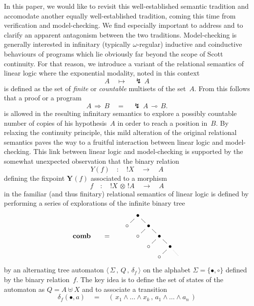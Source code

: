 \documentclass[runningheads,a4paper]{llncs}
\newcommand{\superbang}{\lightning} \newcommand{\modality}{\Box}
\newcommand{\tensor}{\otimes}
\newcommand{\morph}[1]{\stackrel{#1}{\longrightarrow}}
\newcommand{\fixpoint}[1]{\textbf{Y}_{#1}}
\begin{document}
In this paper, we would like to revisit this well-established semantic tradition and accomodate another equally well-established tradition,
coming this time from verification and model-checking.
We find especially important to address and to clarify an apparent antagonism between the two traditions.
Model-checking is generally interested in infinitary (typically $\omega$-regular) inductive and coinductive behaviours 
of programs which lie obviously far beyond the scope of Scott continuity.
For that reason, we introduce a variant of the relational semantics of linear logic 
where the exponential modality, noted in this context
$$
A \quad \mapsto \quad \superbang \, A
$$
is defined as the set of \emph{finite} or \emph{countable} multisets of the set~$A$.
From this follows that a proof or a program
$$
A \, \Rightarrow \, B \quad = \quad \superbang\, A \, \multimap \, B.
$$
is allowed in the resulting infinitary semantics to explore
a possibly countable number of copies of his hypothesis~$A$ 
in order to reach a position in~$B$.
By relaxing the continuity principle, this mild alteration of the original relational semantics
paves the way to a fruitful interaction between linear logic and model-checking.
This link between linear logic and model-checking is supported by the somewhat unexpected observation 
that the binary relation 
$$Y(f) \quad : \quad ! X \quad \morph{} \quad A$$
defining the fixpoint $\fixpoint{}(f)$ associated to a morphism
$$f \quad : \quad ! X \, \tensor \, !A \quad \morph{} \quad A$$
in the familiar (and thus finitary) relational semantics of linear logic 
is defined by performing a series of explorations of the infinite binary tree
$$
\begin{array}{ccc}
\textbf{comb}
&
\quad = \quad &
\vcenter{\xymatrix @-1.6pc {
&\bullet \ar@{-}[rd]\ar@{-}[ld]
\\
\circ && \bullet \ar@{-}[rd]\ar@{-}[ld]
\\
& \circ && \bullet \ar@{-}[rd]\ar@{-}[ld]
\\
&& \circ && \bullet \ar@{.}[rd]\ar@{-}[ld]
\\
&&& \circ &&
}}
\end{array}
$$
by an alternating tree automaton $\langle \, \Sigma \, , \, Q \, , \, \delta_f \, \rangle$
on the alphabet $\Sigma=\{\bullet,\circ\}$ defined by the binary relation~$f$.
The key idea is to define the set of states of the automaton as $Q=A\uplus X$ and to associate a transition 
$$
\delta_f(\bullet,a) \quad = \quad (\, x_1\wedge \dots \wedge x_k \, , \,  a_1\wedge \dots \wedge a_n \, )
$$
\end{document}
